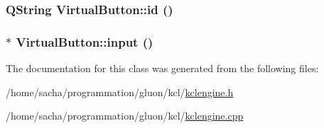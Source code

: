 \hypertarget{class_virtual_button_7ac53085bb39fa49b8f9f32ca882e4db}{
\subsubsection[{id}]{\setlength{\rightskip}{0pt plus 5cm}QString VirtualButton::id ()}}
\label{class_virtual_button_7ac53085bb39fa49b8f9f32ca882e4db}


\hypertarget{class_virtual_button_1c67f8dec41ff21d0aa5c07225771e07}{
\subsubsection[{input}]{$\ast$ VirtualButton::input ()}}
\label{class_virtual_button_1c67f8dec41ff21d0aa5c07225771e07}




The documentation for this class was generated from the following files:\begin{CompactItemize}
\item 
/home/sacha/programmation/gluon/kcl/\hyperlink{kclengine_8h}{kclengine.h}\item 
/home/sacha/programmation/gluon/kcl/\hyperlink{kclengine_8cpp}{kclengine.cpp}\end{CompactItemize}
